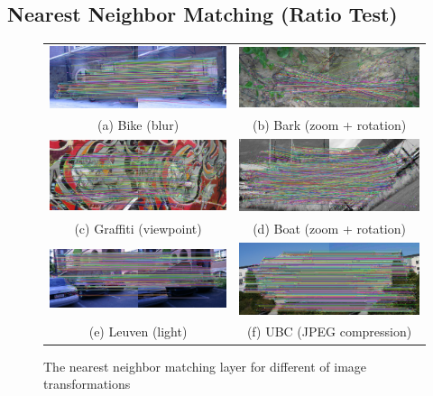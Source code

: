 \subsection {Nearest Neighbor Matching (Ratio Test)}
\begin{figure}[H]
\begin{tabular}{cc}
  \includegraphics[width=75mm]{figures/bike_nn_1_3} &  \includegraphics[width=75mm]{figures/barks_nn_1_3} \\
(a) Bike (blur) & (b) Bark (zoom + rotation) \\[6pt]
 \includegraphics[width=75mm]{figures/graffiti_nn_1_3} &  \includegraphics[width=75mm]{figures/boat_nn_1_3} \\
(c) Graffiti (viewpoint) & (d) Boat (zoom + rotation) \\[6pt]
 \includegraphics[width=75mm]{figures/leuven_nn_1_3} &  \includegraphics[width=75mm]{figures/ubc_nn_1_3} \\
(e) Leuven (light) & (f) UBC (JPEG compression) \\[6pt]
\end{tabular}
\caption{The nearest neighbor matching layer for different of image transformations}\label{fig:nearest_neighbor_matching}
\end{figure}

